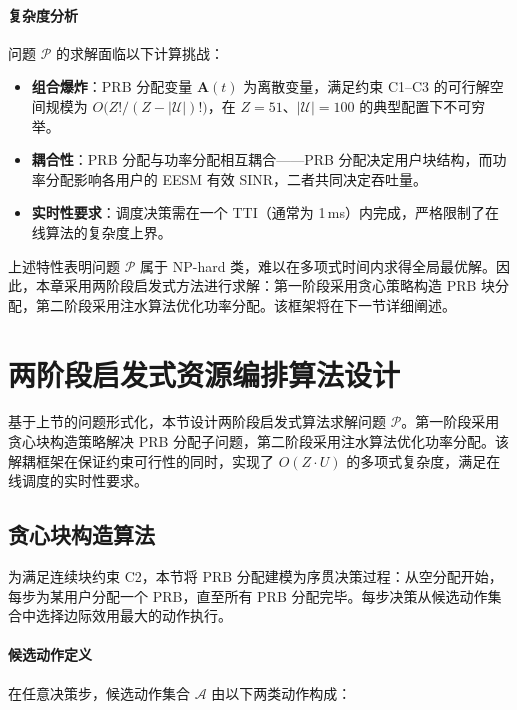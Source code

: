 \documentclass[type=master]{fduthesis}
\begin{document}
\paragraph{复杂度分析}
问题 $\mathcal{P}$ 的求解面临以下计算挑战：

\begin{itemize}
\item \textbf{组合爆炸}：PRB 分配变量 $\mathbf{A}(t)$ 为离散变量，满足约束 C1--C3 的可行解空间规模为 $O\big(Z! / (Z - |\mathcal{U}|)!\big)$，在 $Z=51$、$|\mathcal{U}|=100$ 的典型配置下不可穷举。

\item \textbf{耦合性}：PRB 分配与功率分配相互耦合——PRB 分配决定用户块结构，而功率分配影响各用户的 EESM 有效 SINR，二者共同决定吞吐量。

\item \textbf{实时性要求}：调度决策需在一个 TTI（通常为 1\,ms）内完成，严格限制了在线算法的复杂度上界。
\end{itemize}

上述特性表明问题 $\mathcal{P}$ 属于 NP-hard 类，难以在多项式时间内求得全局最优解。因此，本章采用两阶段启发式方法进行求解：第一阶段采用贪心策略构造 PRB 块分配，第二阶段采用注水算法优化功率分配。该框架将在下一节详细阐述。

\section{两阶段启发式资源编排算法设计}
\label{sec:ch4_heuristic}

基于上节的问题形式化，本节设计两阶段启发式算法求解问题 $\mathcal{P}$。第一阶段采用贪心块构造策略解决 PRB 分配子问题，第二阶段采用注水算法优化功率分配。该解耦框架在保证约束可行性的同时，实现了 $O(Z \cdot U)$ 的多项式复杂度，满足在线调度的实时性要求。

\subsection{贪心块构造算法}
\label{subsec:ch4_greedy_block}

为满足连续块约束 C2，本节将 PRB 分配建模为序贯决策过程：从空分配开始，每步为某用户分配一个 PRB，直至所有 PRB 分配完毕。每步决策从候选动作集合中选择边际效用最大的动作执行。

\paragraph{候选动作定义}
在任意决策步，候选动作集合 $\mathcal{A}$ 由以下两类动作构成：
\end{document}
